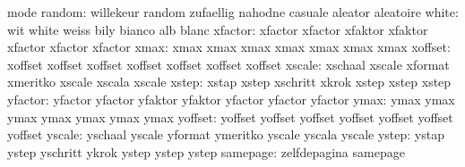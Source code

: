                            mode
                   random: willekeur                 random
                           zufaellig                 nahodne
                           casuale                   aleator
                           aleatoire
                    white: wit                       white
                           weiss                     bily
                           bianco                    alb
                           blanc
                  xfactor: xfactor                   xfactor
                           xfaktor                   xfaktor
                           xfactor                   xfactor
                           xfactor
                     xmax: xmax                      xmax
                           xmax                      xmax
                           xmax                      xmax
                           xmax
                  xoffset: xoffset                   xoffset
                           xoffset                   xoffset
                           xoffset                   xoffset
                           xoffset
                   xscale: xschaal                   xscale
                           xformat                   xmeritko
                           xscale                    xscala
                           xscale
                    xstep: xstap                     xstep
                           xschritt                  xkrok
                           xstep                     xstep
                           xstep
                  yfactor: yfactor                   yfactor
                           yfaktor                   yfaktor
                           yfactor                   yfactor
                           yfactor
                     ymax: ymax                      ymax
                           ymax                      ymax
                           ymax                      ymax
                           ymax
                  yoffset: yoffset                   yoffset
                           yoffset                   yoffset
                           yoffset                   yoffset
                           yoffset
                   yscale: yschaal                   yscale
                           yformat                   ymeritko
                           yscale                    yscala
                           yscale
                    ystep: ystap                     ystep
                           yschritt                  ykrok
                           ystep                     ystep
                           ystep
                 samepage: zelfdepagina              samepage
